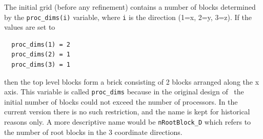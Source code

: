 The initial grid (before any refinement) contains
a number of blocks determined by the {\tt proc\_dims(i)} variable, where
{\tt i} is the direction (1=x, 2=y, 3=z).  If the values are set to
\begin{verbatim}
  proc_dims(1) = 2
  proc_dims(2) = 1
  proc_dims(3) = 1
\end{verbatim}
then the top level blocks form a brick consisting of 2 blocks arranged
along the x axis. This variable is called {\tt proc\_dims} because in
the original design of \BATSRUS\ the initial number of blocks could
not exceed the number of processors.  In the current version there is
no such restriction, and the name is kept for historical reasons
only. A more descriptive name would be {\tt nRootBlock\_D} which
refers to the number of root blocks in the 3 coordinate directions.

